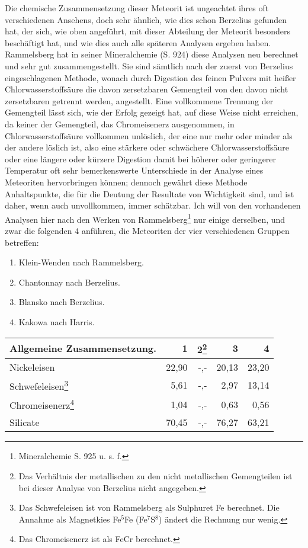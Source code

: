 \documentclass[a4paper, 11pt, oneside]{article}
\begin{document}
Die chemische Zusammensetzung dieser Meteorit ist ungeachtet ihres oft verschiedenen Ansehens, doch sehr ähnlich, wie dies schon Berzelius gefunden hat, der sich, wie oben angeführt, mit dieser Abteilung der Meteorit besonders beschäftigt hat, und wie dies auch alle späteren Analysen ergeben haben. Rammelsberg hat in seiner Mineralchemie (S. 924) diese Analysen neu berechnet und sehr gut zusammengestellt. Sie sind sämtlich nach der zuerst von Berzelius eingeschlagenen Methode, wonach durch Digestion des feinen Pulvers mit heißer Chlorwasserstoffsäure die davon zersetzbaren Gemengteil von den davon nicht zersetzbaren getrennt werden, angestellt. Eine vollkommene Trennung der Gemengteil lässt sich, wie der Erfolg gezeigt hat, auf diese Weise nicht erreichen, da keiner der Gemengteil, das Chromeisenerz ausgenommen, in Chlorwasserstoffsäure vollkommen unlöslich, der eine nur mehr oder minder als der andere löslich ist, also eine stärkere oder schwächere Chlorwasserstoffsäure oder eine längere oder kürzere Digestion damit bei höherer oder geringerer Temperatur oft sehr bemerkenswerte Unterschiede in der Analyse eines Meteoriten hervorbringen können; dennoch gewährt diese Methode Anhaltspunkte, die für die Deutung der Resultate von Wichtigkeit sind, und ist daher, wenn auch unvollkommen, immer schätzbar. Ich will von den vorhandenen Analysen hier nach den Werken von Rammelsberg\footnote{Mineralchemie S. 925 u. s. f.} nur einige derselben, und zwar die folgenden 4 anführen, die Meteoriten der vier verschiedenen Gruppen betreffen:
\begin{enumerate}
    \item Klein-Wenden nach Rammelsberg.
    \item Chantonnay nach Berzelius.
    \item Blansko nach Berzelius.
    \item Kakowa nach Harris.
\end{enumerate}
\clearpage
\begin{center}
\begin{tabular}{ |l|r|r|r|r| }
    \hline
    Allgemeine Zusammensetzung. & 1 & 2\footnote{Das Verhältnis der metallischen zu den nicht metallischen Gemengteilen ist bei dieser Analyse von Berzelius nicht angegeben.} & 3 & 4\\
    \hline\hline
    Nickeleisen & 22,90 & -,- & 20,13 & 23,20\\\hline
    Schwefeleisen\footnote{Das Schwefeleisen ist von Rammelsberg als Sulphuret Fe berechnet. Die Annahme als Magnetkies Fe$^{5}$Fe (Fe$^{7}$S$^{8}$) ändert die Rechnung nur wenig.} & 5,61 & -,- & 2,97 & 13,14\\\hline
    Chromeisenerz\footnote{Das Chromeisenerz ist als FeCr berechnet.} & 1,04 & -,- & 0,63 & 0,56\\\hline
    Silicate & 70,45 & -,- & 76,27 & 63,21\\
    \hline
\end{tabular}
\end{center}
\end{document}
